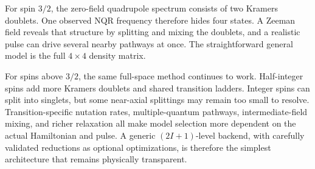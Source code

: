 \documentclass[11pt,letterpaper]{article}
\begin{document}
For spin $3/2$, the zero-field quadrupole spectrum consists of two Kramers doublets. One observed NQR frequency therefore hides four states. A Zeeman field reveals that structure by splitting and mixing the doublets, and a realistic pulse can drive several nearby pathways at once. The straightforward general model is the full $4\times4$ density matrix.

For spins above $3/2$, the same full-space method continues to work. Half-integer spins add more Kramers doublets and shared transition ladders. Integer spins can split into singlets, but some near-axial splittings may remain too small to resolve. Transition-specific nutation rates, multiple-quantum pathways, intermediate-field mixing, and richer relaxation all make model selection more dependent on the actual Hamiltonian and pulse. A generic $(2I+1)$-level backend, with carefully validated reductions as optional optimizations, is therefore the simplest architecture that remains physically transparent.
\end{document}
